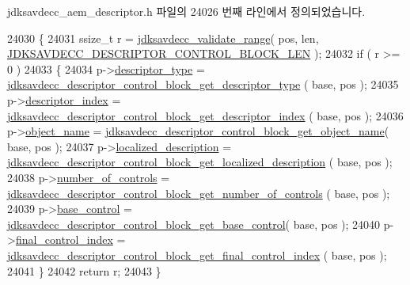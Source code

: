 jdksavdecc\+\_\+aem\+\_\+descriptor.\+h 파일의 24026 번째 라인에서 정의되었습니다.


\begin{DoxyCode}
24030 \{
24031     ssize\_t r = \hyperlink{group__util_ga9c02bdfe76c69163647c3196db7a73a1}{jdksavdecc\_validate\_range}( pos, len, 
      \hyperlink{group__descriptor__control__block_gaff7f491436a268217f239cfe713a71c4}{JDKSAVDECC\_DESCRIPTOR\_CONTROL\_BLOCK\_LEN} );
24032     \textcolor{keywordflow}{if} ( r >= 0 )
24033     \{
24034         p->\hyperlink{structjdksavdecc__descriptor__control__block_ab7c32b6c7131c13d4ea3b7ee2f09b78d}{descriptor\_type} = 
      \hyperlink{group__descriptor__control__block_ga6c0f9bca7a62b58b7a94a89e8d703807}{jdksavdecc\_descriptor\_control\_block\_get\_descriptor\_type}
      ( base, pos );
24035         p->\hyperlink{structjdksavdecc__descriptor__control__block_a042bbc76d835b82d27c1932431ee38d4}{descriptor\_index} = 
      \hyperlink{group__descriptor__control__block_ga5f83c5755ec74b7051fe847c5fd2b467}{jdksavdecc\_descriptor\_control\_block\_get\_descriptor\_index}
      ( base, pos );
24036         p->\hyperlink{structjdksavdecc__descriptor__control__block_a7d1f5945a13863b1762fc6db74fa8f80}{object\_name} = 
      \hyperlink{group__descriptor__control__block_ga55448f6f51919698a8711c3c8dc5016e}{jdksavdecc\_descriptor\_control\_block\_get\_object\_name}( 
      base, pos );
24037         p->\hyperlink{structjdksavdecc__descriptor__control__block_a0926f846ca65a83ad5bb06b4aff8f408}{localized\_description} = 
      \hyperlink{group__descriptor__control__block_gaf65a5fef222d0937b4eb892cbb498e4f}{jdksavdecc\_descriptor\_control\_block\_get\_localized\_description}
      ( base, pos );
24038         p->\hyperlink{structjdksavdecc__descriptor__control__block_a0104bea638bdadf1a547c2b93813e22f}{number\_of\_controls} = 
      \hyperlink{group__descriptor__control__block_ga13a5b79837792669beafeb159f90bd35}{jdksavdecc\_descriptor\_control\_block\_get\_number\_of\_controls}
      ( base, pos );
24039         p->\hyperlink{structjdksavdecc__descriptor__control__block_af06eac7dd98377a85258308e8a25e7f2}{base\_control} = 
      \hyperlink{group__descriptor__control__block_ga23503e36956db5a06a001820db961730}{jdksavdecc\_descriptor\_control\_block\_get\_base\_control}( 
      base, pos );
24040         p->\hyperlink{structjdksavdecc__descriptor__control__block_a6853bf58b4f94780a8c4b05bbaad059a}{final\_control\_index} = 
      \hyperlink{group__descriptor__control__block_ga316f0911236c7d313a1055e6f3e5c297}{jdksavdecc\_descriptor\_control\_block\_get\_final\_control\_index}
      ( base, pos );
24041     \}
24042     \textcolor{keywordflow}{return} r;
24043 \}
\end{DoxyCode}


